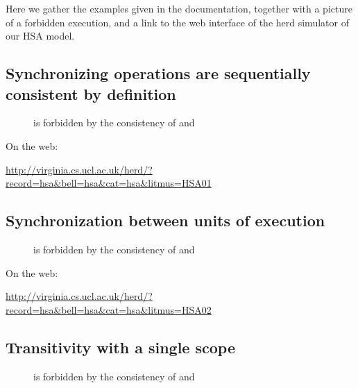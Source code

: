 \documentclass[a4paper]{article}
\begin{document}
Here we gather the examples given in the documentation, together with a picture
of a forbidden execution, and a link to the web interface of the {\sf herd}
simulator of our HSA model.

\subsection{Synchronizing operations are sequentially consistent by definition}
\begin{multicols}{2}

\end{multicols}
\begin{figure}[htp]
\begin{center}\moveback{}
\end{center}
\caption{\label{hsa01}  is forbidden by the consistency
of  and \coh{} \color{red}{(Forbidden)}}
\end{figure}

On the web:

\url{http://virginia.cs.ucl.ac.uk/herd/?record=hsa&bell=hsa&cat=hsa&litmus=HSA01}

\pagebreak

\subsection{Synchronization between units of execution}


\begin{figure}[htp]
\begin{center}\moveback{}
\end{center}
\caption{\label{hsa02}  is forbidden by the consistency
of \hhb{} and \coh{} \color{red}{(Forbidden)}}
\end{figure}

On the web:

\url{http://virginia.cs.ucl.ac.uk/herd/?record=hsa&bell=hsa&cat=hsa&litmus=HSA02}

\pagebreak

\subsection{Transitivity with a single scope}


\begin{figure}[H]
\begin{center}\moveback{}
\end{center}
\caption{\label{hsa03}  is forbidden by the consistency
of \hhb{} and \coh{} \color{red}{(Forbidden)}}
\end{figure}
\end{document}
